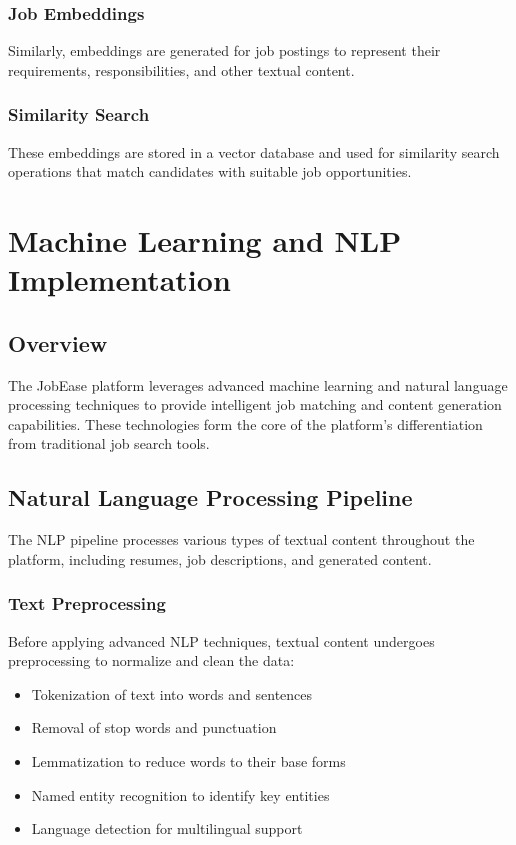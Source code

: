 \documentclass[12pt,a4paper]{report}
\begin{document}
\subsection{Job Embeddings}
Similarly, embeddings are generated for job postings to represent their requirements, responsibilities, and other textual content.

\subsection{Similarity Search}
These embeddings are stored in a vector database and used for similarity search operations that match candidates with suitable job opportunities.

\chapter{Machine Learning and NLP Implementation}

\section{Overview}
The JobEase platform leverages advanced machine learning and natural language processing techniques to provide intelligent job matching and content generation capabilities. These technologies form the core of the platform's differentiation from traditional job search tools.

\section{Natural Language Processing Pipeline}
The NLP pipeline processes various types of textual content throughout the platform, including resumes, job descriptions, and generated content.

\subsection{Text Preprocessing}
Before applying advanced NLP techniques, textual content undergoes preprocessing to normalize and clean the data:
\begin{itemize}[leftmargin=2em]
  \item Tokenization of text into words and sentences
  \item Removal of stop words and punctuation
  \item Lemmatization to reduce words to their base forms
  \item Named entity recognition to identify key entities
  \item Language detection for multilingual support
\end{itemize}
\end{document}
